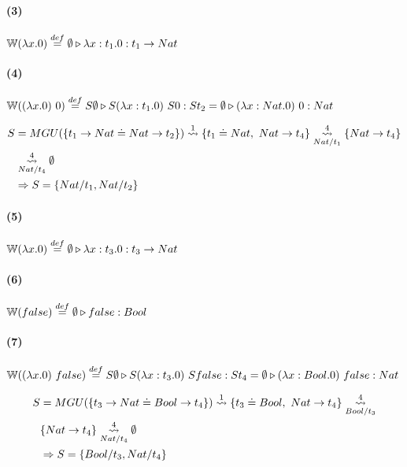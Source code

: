 \documentclass[10pt,a4paper]{article}
\begin{document}
\paragraph{(3)} $\WFunc(\lambdaAbsI{x}{0}) \equalDef \judgeType{\emptyset}{\lambdaAbs{x}{t_1}{0}}{t_1\to Nat}$

\paragraph{(4)} $\WFunc((\lambdaAbsI{x}{0})~0) \equalDef \judgeType{S\emptyset}{S(\lambdaAbs{x}{t_1}{0})~S0}{St_2} = \judgeType{\emptyset}{(\lambdaAbs{x}{Nat}{0})~0}{Nat}$

\begin{centrado}
\begin{align*}
S &= MGU(\{t_1\to Nat \doteq Nat\to t_2\}) \goesTo{1}{} \{t_1\doteq Nat,~ Nat \to t_4\} \goesTo{4}{Nat/t_1} \{Nat \to t_4\} \\
&\goesTo{4}{Nat/t_4} \emptyset \\
&\Rightarrow S=\{Nat/t_1, Nat/t_2\}
\end{align*}
\end{centrado}

\vspace*{5mm}
\begin{multicols}{2}
\paragraph{(5)} $\WFunc(\lambdaAbsI{x}{0}) \equalDef \judgeType{\emptyset}{\lambdaAbs{x}{t_3}{0}}{t_3\to Nat}$

\paragraph{(6)} $\WFunc(false) \equalDef \judgeType{\emptyset}{false}{Bool}$
\end{multicols}


\paragraph{(7)} $\WFunc((\lambdaAbsI{x}{0})~false) \equalDef \judgeType{S\emptyset}{S(\lambdaAbs{x}{t_3}{0})~Sfalse}{St_4} = \judgeType{\emptyset}{(\lambdaAbs{x}{Bool}{0})~false}{Nat}$

\begin{centrado}
\begin{align*}
S &= MGU(\{t_3\to Nat \doteq Bool\to t_4\}) \goesTo{1}{} \{t_3\doteq Bool,~ Nat \to t_4\} \goesTo{4}{Bool/t_3} \\
&\{Nat \to t_4\} \goesTo{4}{Nat/t_4} \emptyset \\
&\Rightarrow S=\{Bool/t_3, Nat/t_4\}
\end{align*}
\end{centrado}
\end{document}
